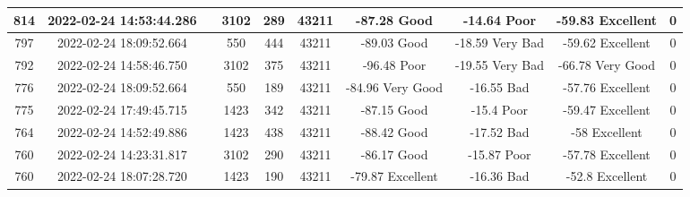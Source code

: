 \begin{longtable*}{|c|c|c|c|c|c|c|c|c|c|}
814&2022-02-24 14:53:44.286&&3102&289&43211& -87.28    Good        & -14.64    Poor        & -59.83    Excellent   & 0\\\hline
{}797&2022-02-24 18:09:52.664&&550&444&43211& -89.03    Good        & -18.59    Very Bad    & -59.62    Excellent   & 0\\\hline
{}792&2022-02-24 14:58:46.750&&3102&375&43211& -96.48    Poor        & -19.55    Very Bad    & -66.78    Very Good   & 0\\\hline
{}776&2022-02-24 18:09:52.664&&550&189&43211& -84.96    Very Good   & -16.55    Bad         & -57.76    Excellent   & 0\\\hline
{}775&2022-02-24 17:49:45.715&&1423&342&43211& -87.15    Good        & -15.4     Poor        & -59.47    Excellent   & 0\\\hline
{}764&2022-02-24 14:52:49.886&&1423&438&43211& -88.42    Good        & -17.52    Bad         & -58       Excellent   & 0\\\hline
{}760&2022-02-24 14:23:31.817&&3102&290&43211& -86.17    Good        & -15.87    Poor        & -57.78    Excellent   & 0\\\hline
{}760&2022-02-24 18:07:28.720&&1423&190&43211& -79.87    Excellent   & -16.36    Bad         & -52.8     Excellent   & 0\\\hline

\end{longtable*}
